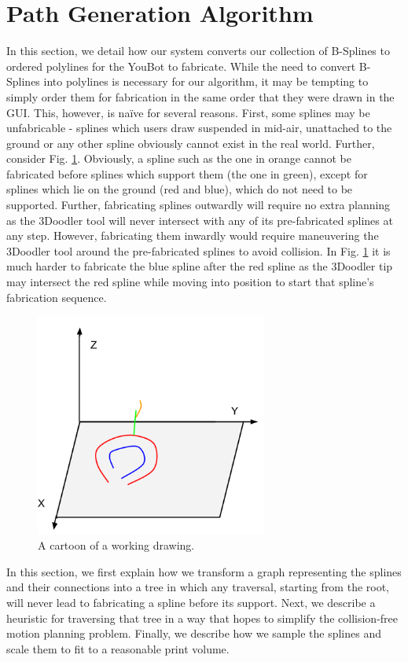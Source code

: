 \documentclass[conference]{acmsiggraph}
\begin{document}
\section{Path Generation Algorithm}
In this section, we detail how our system converts our collection of B-Splines to ordered polylines for the YouBot to fabricate.  While the need to convert B-Splines into polylines is necessary for our algorithm, it may be tempting to simply order them for fabrication in the same order that they were drawn in the GUI.  This, however, is na{\"i}ve for several reasons.  First, some splines may be unfabricable - splines which users draw suspended in mid-air, unattached to the ground or any other spline obviously cannot exist in the real world.  Further, consider Fig. \ref{fig:splines}.  Obviously, a spline such as the one in orange cannot be fabricated before splines which support them (the one in green), except for splines which lie on the ground (red and blue), which do not need to be supported.  Further, fabricating splines outwardly will require no extra planning as the 3Doodler tool will never intersect with any of its pre-fabricated splines at any step.  However, fabricating them inwardly would require maneuvering the 3Doodler tool around the pre-fabricated splines to avoid collision.  In Fig. \ref{fig:splines} it is much harder to fabricate the blue spline after the red spline as the 3Doodler tip may intersect the red spline while moving into position to start that spline's fabrication sequence.

\begin{figure}[t]
\centering
\includegraphics[width=3.0in]{images/Splines.png}
\caption{A cartoon of a working drawing.}
\label{fig:splines}
\end{figure}

In this section, we first explain how we transform a graph representing the splines and their connections into a tree in which any traversal, starting from the root, will never lead to fabricating a spline before its support.  Next, we describe a heuristic for traversing that tree in a way that hopes to simplify the collision-free motion planning problem.  Finally, we describe how we sample the splines and scale them to fit to a reasonable print volume.
\end{document}
